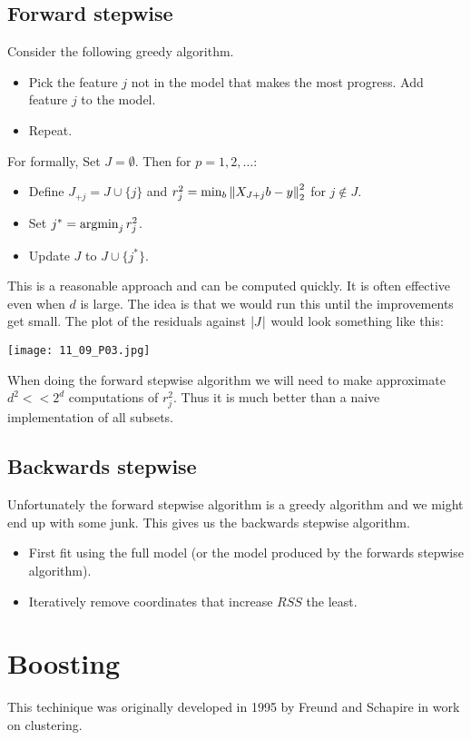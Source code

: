 \subsection{Forward stepwise}
Consider the following greedy algorithm.
\begin{itemize}
    \item Pick the feature $j$ not in the model that makes the most progress. Add feature $j$ to the model.
    \item Repeat.
\end{itemize}
For formally, Set $J=\emptyset$. Then for $p=1,2,\ldots$:
\begin{itemize}
    \item Define $J_{+j}= J \cup \{j\}$ and $r_j^2 = \min_b \left\|X_{J+j}b - y\right\|_2^2$ for $j \notin J$.
    \item Set $j^* = \operatorname*{argmin}_j r_j^2$.
    \item Update $J$ to $J\cup \{j^*\}$. 
\end{itemize}
This is a reasonable approach and can be computed quickly. It is often effective even when $d$ is large. The idea is that we would run this until the improvements get small. The plot of the residuals against ${\left\lvert J\right\rvert}$ would look something like this:

\begin{center}
    \texttt{[image: 11\_09\_P03.jpg]}
\end{center}

When doing the forward stepwise algorithm we will need to make approximate $d^2 << 2^d$ computations of $r_j^2$. Thus it is much better than a naive implementation of all subsets. 

\subsection{Backwards stepwise}
Unfortunately the forward stepwise algorithm is a greedy algorithm and we might end up with some junk. This gives us the backwards stepwise algorithm. 
\begin{itemize}
    \item First fit using the full model (or the model produced by the forwards stepwise algorithm).
    \item Iteratively remove coordinates that increase $RSS$ the least.
\end{itemize}
\section{Boosting}
This techinique was originally developed in 1995 by Freund and Schapire in work on clustering. 

